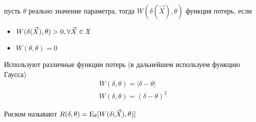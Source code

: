 \documentclass[main.tex]{subfiles}
\begin{document}
\begin{definition}
	пусть $\theta$ реально значение параметра, тогда $W(\delta (\vec{X}),\theta)$ функция потерь, если
	\begin{itemize}
	 	\item $W(\delta (\vec{X}),\theta)>0,\forall \vec{X} \in \mathfrak{X}$
	 	\item $W(\theta,\theta)=0$
	 \end{itemize} 
\end{definition}
Используют различные функции потерь (в дальнейшем используем функцию Гаусса)
\begin{align}
	& W(\delta,\theta)=|\delta-\theta| \tag{Лаплас} \\
	& W(\delta,\theta)=(\delta-\theta)^2 \tag{Гаусс}
\end{align}

\begin{definition}[Риск]
	Риском называют $R(\delta,\theta) = \mathrm{E}_\theta[W(\delta(\vec{X}),\theta)]$
\end{definition}
\end{document}

